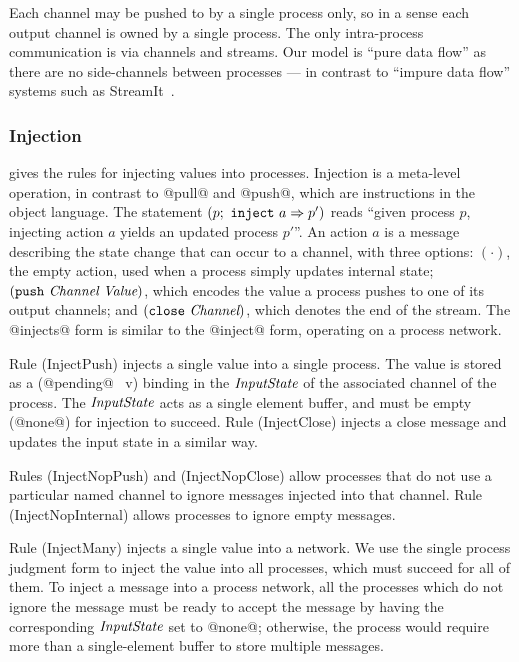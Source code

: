 Each channel may be pushed to by a single process only, so in a sense each output channel is owned by a single process.
The only intra-process communication is via channels and streams.
Our model is ``pure data flow'' as there are no side-channels between processes --- in contrast to ``impure data flow'' systems such as StreamIt~\cite{thies2002streamit}.



\subsubsection{Injection}
 gives the rules for injecting values into processes.
Injection is a meta-level operation, in contrast to @pull@ and @push@, which are instructions in the object language.
The statement $(p;~\texttt{inject}~a \Rightarrow p')$ reads ``given process $p$, injecting action $a$ yields an updated process $p'$''.
An action $a$ is a message describing the state change that can occur to a channel, with three options: $(\cdot)$, the empty action, used when a process simply updates internal state; $(\texttt{push}~\textit{Channel}~\textit{Value})$, which encodes the value a process pushes to one of its output channels; and $(\texttt{close}~\textit{Channel})$, which denotes the end of the stream.
The @injects@ form is similar to the @inject@ form, operating on a process network.

Rule (InjectPush) injects a single value into a single process. The value is stored as a (@pending@~ v) binding in the $\textit{InputState}$ of the associated channel of the process. The $\textit{InputState}$ acts as a single element buffer, and must be empty (@none@) for injection to succeed.
Rule (InjectClose) injects a close message and updates the input state in a similar way.

Rules (InjectNopPush) and (InjectNopClose) allow processes that do not use a particular named channel to ignore messages injected into that channel.
Rule (InjectNopInternal) allows processes to ignore empty messages.

Rule (InjectMany) injects a single value into a network.
We use the single process judgment form to inject the value into all processes, which must succeed for all of them.
To inject a message into a process network, all the processes which do not ignore the message must be ready to accept the message by having the corresponding $\textit{InputState}$ set to @none@; otherwise, the process would require more than a single-element buffer to store multiple messages.



